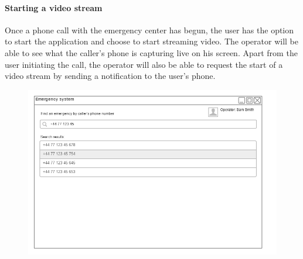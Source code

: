 \documentclass{article}
\begin{document}
			\paragraph{Starting a video stream}
			Once a phone call with the emergency center has begun, the user has the option to start the application and choose to start streaming video. The operator will be able to see what the caller’s phone is capturing live on his screen. Apart from the user initiating the call, the operator will also be able to request the start of a video stream by sending a notification to the user’s phone.
	\begin{figure}[H]
		\centering
		\includegraphics[width=1\textwidth]{"EmergencyAppIteration1/iteration1backendsearch"}
	\end{figure}
	
\end{document}
